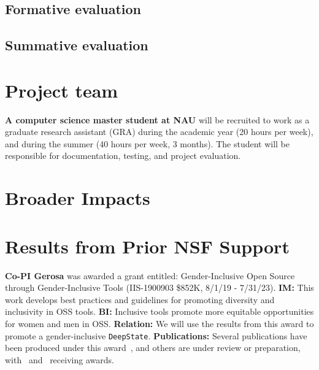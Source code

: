 \documentclass[numbers]{proposalnsf}
\newcommand{\ds}{\texttt{DeepState}}
\begin{document}
\subsection{Formative evaluation}


\subsection{Summative evaluation}

\section{Project team}


\textbf{A computer science master student at NAU} will be recruited to work as a graduate research assistant (GRA) during the academic year (20 hours per week), and during the summer (40 hours per week, 3 months).
The student will be responsible for documentation, testing, and project evaluation.

\section{Broader Impacts}



\section{Results from Prior NSF Support}



\textbf{Co-PI Gerosa} was awarded a grant entitled: Gender-Inclusive Open Source through Gender-Inclusive Tools (IIS-1900903 \$852K, 8/1/19 - 7/31/23). 
\textbf{IM:} This work develops best practices and guidelines for promoting diversity and inclusivity in OSS tools. 
\textbf{BI:} Inclusive tools promote more equitable opportunities for women and men in OSS. 
\textbf{Relation:} We will use the results from this award to promote a gender-inclusive  \ds.
\textbf{Publications:} Several publications have been produced under this award~\cite{balali2020recommending,dias2021makes,silva2020google,gerosa2021shifting,silva2020theory,trinkenreich2020hidden,chatterjee2021aid,mendez2019gendermag,stumpf2020gender,guizani2020gender,hilderbrand2020engineering,padala2020gender,wessel2020effects}, and others are under review or preparation, with~\cite{balali2020recommending} and~\cite{wessel2020effects} receiving awards. 


\newpage
%


\end{document}

